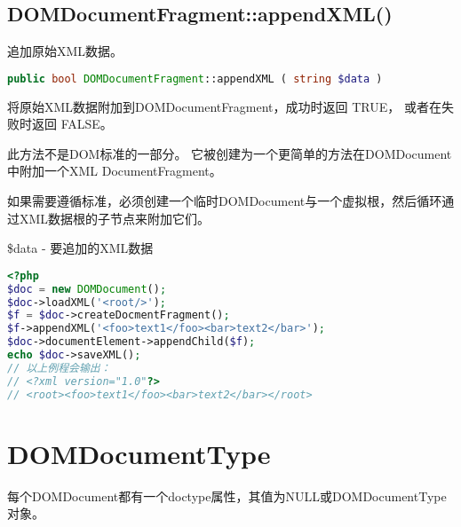 \subsection{DOMDocumentFragment::appendXML()}

追加原始XML数据。


\begin{lstlisting}[language=PHP]
public bool DOMDocumentFragment::appendXML ( string $data )
\end{lstlisting}


将原始XML数据附加到DOMDocumentFragment，成功时返回 TRUE， 或者在失败时返回 FALSE。

此方法不是DOM标准的一部分。 它被创建为一个更简单的方法在DOMDocument中附加一个XML DocumentFragment。

如果需要遵循标准，必须创建一个临时DOMDocument与一个虚拟根，然后循环通过XML数据根的子节点来附加它们。

\begin{compactitem}
\item \$data - 要追加的XML数据
\end{compactitem}



\begin{lstlisting}[language=PHP]
<?php
$doc = new DOMDocument();
$doc->loadXML('<root/>');
$f = $doc->createDocmentFragment();
$f->appendXML('<foo>text1</foo><bar>text2</bar>');
$doc->documentElement->appendChild($f);
echo $doc->saveXML();
// 以上例程会输出：
// <?xml version="1.0"?>
// <root><foo>text1</foo><bar>text2</bar></root>
\end{lstlisting}



\section{DOMDocumentType}

每个DOMDocument都有一个doctype属性，其值为NULL或DOMDocumentType对象。

